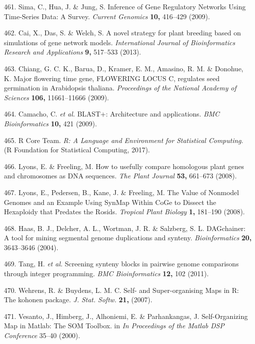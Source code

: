 \documentclass[12pt,]{book}
\begin{document}
\hypertarget{ref-sima_inference_2009}{}
461. Sima, C., Hua, J. \& Jung, S. Inference of Gene Regulatory Networks
Using Time-Series Data: A Survey. \emph{Current Genomics} \textbf{10,}
416--429 (2009).

\hypertarget{ref-cai_novel_2013}{}
462. Cai, X., Das, S. \& Welch, S. A novel strategy for plant breeding
based on simulations of gene network models. \emph{International Journal
of Bioinformatics Research and Applications} \textbf{9,} 517--533
(2013).

\hypertarget{ref-chiang_major_2009}{}
463. Chiang, G. C. K., Barua, D., Kramer, E. M., Amasino, R. M. \&
Donohue, K. Major flowering time gene, FLOWERING LOCUS C, regulates seed
germination in Arabidopsis thaliana. \emph{Proceedings of the National
Academy of Sciences} \textbf{106,} 11661--11666 (2009).

\hypertarget{ref-camacho_blast_2009}{}
464. Camacho, C. \emph{et al.} BLAST+: Architecture and applications.
\emph{BMC Bioinformatics} \textbf{10,} 421 (2009).

\hypertarget{ref-r_core_team_r_2017}{}
465. R Core Team. \emph{R: A Language and Environment for Statistical
Computing}. (R Foundation for Statistical Computing, 2017).

\hypertarget{ref-lyons_how_2008}{}
466. Lyons, E. \& Freeling, M. How to usefully compare homologous plant
genes and chromosomes as DNA sequences. \emph{The Plant Journal}
\textbf{53,} 661--673 (2008).

\hypertarget{ref-lyons_value_2008}{}
467. Lyons, E., Pedersen, B., Kane, J. \& Freeling, M. The Value of
Nonmodel Genomes and an Example Using SynMap Within CoGe to Dissect the
Hexaploidy that Predates the Rosids. \emph{Tropical Plant Biology}
\textbf{1,} 181--190 (2008).

\hypertarget{ref-haas_dagchainer_2004}{}
468. Haas, B. J., Delcher, A. L., Wortman, J. R. \& Salzberg, S. L.
DAGchainer: A tool for mining segmental genome duplications and synteny.
\emph{Bioinformatics} \textbf{20,} 3643--3646 (2004).

\hypertarget{ref-tang_screening_2011}{}
469. Tang, H. \emph{et al.} Screening synteny blocks in pairwise genome
comparisons through integer programming. \emph{BMC Bioinformatics}
\textbf{12,} 102 (2011).

\hypertarget{ref-wehrens_self_2007}{}
470. Wehrens, R. \& Buydens, L. M. C. Self- and Super-organising Maps in
R: The kohonen package. \emph{J. Stat. Softw.} \textbf{21,} (2007).

\hypertarget{ref-vesanto_self_organizing_2000}{}
471. Vesanto, J., Himberg, J., Alhoniemi, E. \& Parhankangas, J.
Self-Organizing Map in Matlab: The SOM Toolbox. in \emph{In Proceedings
of the Matlab DSP Conference} 35--40 (2000).
\end{document}
